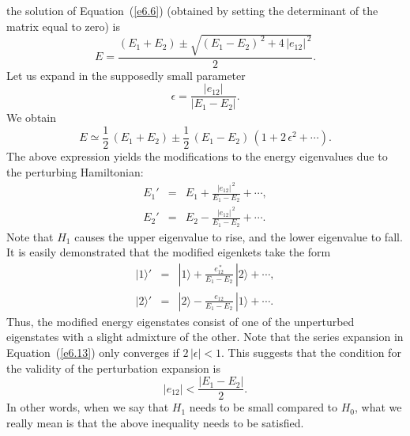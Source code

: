 the solution of Equation~(\ref{e6.6}) (obtained by setting the determinant of the matrix
equal to zero) is
\begin{equation}
E = \frac{(E_1+E_2) \pm \sqrt{(E_1-E_2)^{\,2} + 4\,|e_{12}|^{\,2}}}{2}.
\end{equation}
Let us expand in the supposedly small parameter
\begin{equation}
\epsilon = \frac{|e_{12}|}{|E_1-E_2|}.
\end{equation}
We obtain
\begin{equation}\label{e6.13}
E\simeq \frac{1}{2} \,(E_1+E_2) \pm \frac{1}{2}\,(E_1-E_2)\,(1+2\,\epsilon^2 + \cdots).
\end{equation}
The above expression  yields the modifications to the energy eigenvalues due to
the perturbing Hamiltonian:
\begin{eqnarray}
E_1' &=& E_1 + \frac{|e_{12}|^{\,2}}{E_1-E_2} + \cdots,\\[0.5ex]
E_2' &=& E_2 - \frac{|e_{12}|^{\,2}}{E_1-E_2} + \cdots.
\end{eqnarray}
Note that $H_1$ causes the upper eigenvalue to rise, and the lower
eigenvalue to fall. It is easily demonstrated that the modified eigenkets
take the form
\begin{eqnarray}
|1\rangle' &=& |1\rangle + \frac{e_{12}^{~\ast}}{E_1-E_2}\, |2\rangle + \cdots,
\\[0.5ex]
|2\rangle' &=& |2\rangle - \frac{e_{12}}{E_1-E_2}\, |1\rangle +\cdots.
\end{eqnarray}
Thus, the modified  energy eigenstates consist of one of the unperturbed eigenstates
with a slight admixture of the other. Note that the series expansion in Equation~(\ref{e6.13})
only converges if $2\,|\epsilon|<1$. This suggests that the condition for the 
validity of the perturbation expansion is
\begin{equation}
|e_{12}| < \frac{|E_1-E_2|}{2}.
\end{equation}
In other words, when we say that $H_1$ needs to be small compared to $H_0$,
what we really mean is that the above inequality needs to be satisfied.

